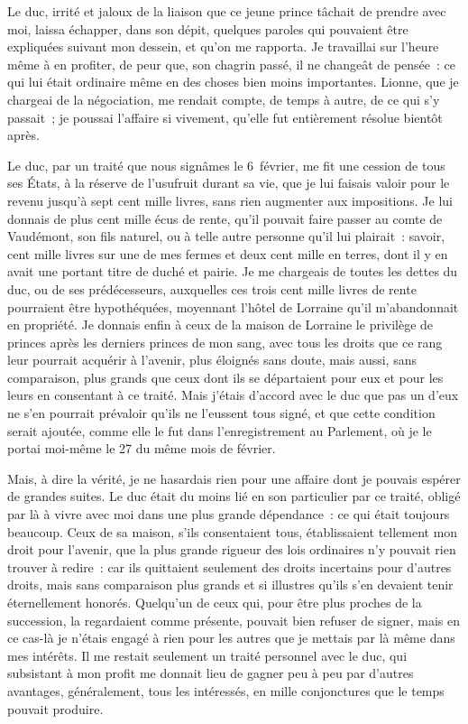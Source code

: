 \documentclass[french,twoside]{book} %
\begin{document}
Le duc, irrité et jaloux de la liaison que ce jeune prince tâchait de prendre avec moi, laissa échapper, dans son dépit, quelques paroles qui pouvaient être expliquées suivant mon dessein, et qu’on me rapporta. Je travaillai sur l’heure même à en profiter, de peur que, son chagrin passé, il ne changeât de pensée : ce qui lui était ordinaire même en des choses bien moins importantes. Lionne, que je chargeai de la négociation, me rendait compte, de temps à autre, de ce qui s’y passait ; je poussai l’affaire si vivement, qu’elle fut entièrement résolue bientôt après.\par
Le duc, par un traité que nous signâmes le 6 février, me fit une cession de tous ses États, à la réserve de l’usufruit durant sa vie, que je lui faisais valoir pour le revenu jusqu’à sept cent mille livres, sans rien augmenter aux impositions. Je lui donnais de plus cent mille écus de rente, qu’il pouvait faire passer au comte de Vaudémont, son fils naturel, ou à telle autre personne qu’il lui plairait : savoir, cent mille livres sur une de mes fermes et deux cent mille en terres, dont il y en avait une portant titre de duché et pairie. Je me chargeais de toutes les dettes du duc, ou de ses prédécesseurs, auxquelles ces trois cent mille livres de rente pourraient être hypothéquées, moyennant l’hôtel de Lorraine qu’il m’abandonnait en propriété. Je donnais enfin à ceux de la maison de Lorraine le privilège de princes après les derniers princes de mon sang, avec tous les droits que ce rang leur pourrait acquérir à l’avenir, plus éloignés sans doute, mais aussi, sans comparaison, plus grands que ceux dont ils se départaient pour eux et pour les leurs en consentant à ce traité. Mais j’étais d’accord avec le duc que pas un d’eux ne s’en pourrait prévaloir qu’ils ne l’eussent tous signé, et que cette condition serait ajoutée, comme elle le fut dans l’enregistrement au Parlement, où je le portai moi-même le 27 du même mois de février.\par
Mais, à dire la vérité, je ne hasardais rien pour une affaire dont je pouvais espérer de grandes suites. Le duc était du moins lié en son particulier par ce traité, obligé par là à vivre avec moi dans une plus grande dépendance : ce qui était toujours beaucoup. Ceux de sa maison, s’ils consentaient tous, établissaient tellement mon droit pour l’avenir, que la plus grande rigueur des lois ordinaires n’y pouvait rien trouver à redire : car ils quittaient seulement des droits incertains pour d’autres droits, mais sans comparaison plus grands et si illustres qu’ils s’en devaient tenir éternellement honorés. Quelqu’un de ceux qui, pour être plus proches de la succession, la regardaient comme présente, pouvait bien refuser de signer, mais en ce cas-là je n’étais engagé à rien pour les autres que je mettais par là même dans mes intérêts. Il me restait seulement un traité personnel avec le duc, qui subsistant à mon profit me donnait lieu de gagner peu à peu par d’autres avantages, généralement, tous les intéressés, en mille conjonctures que le temps pouvait produire.\par
\end{document}
